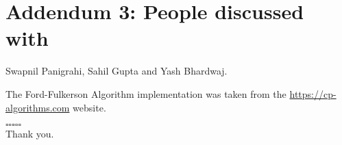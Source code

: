\documentclass{article}
\begin{document}
\section*{Addendum 3: People discussed with}

Swapnil Panigrahi, Sahil Gupta and Yash Bhardwaj.

The Ford-Fulkerson Algorithm implementation was taken from the \href{https://cp-algorithms.com}{https://cp-algorithms.com} website.

\vspace*{\fill}
\begin{center}
    $\square \square \square \square \square$
    \\
    Thank you.
\end{center}
\vspace*{\fill}
\end{document}
